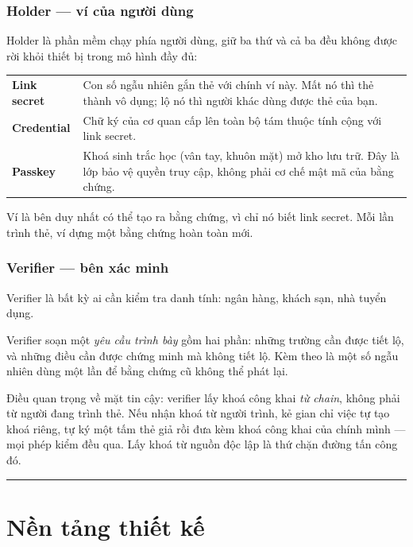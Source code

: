 \documentclass[a4paper,11pt]{article}
\begin{document}
\section{Holder --- ví của người dùng}

Holder là phần mềm chạy phía người dùng, giữ ba thứ và cả ba đều không được rời khỏi thiết
bị trong mô hình đầy đủ:

\begin{center}
\begin{tabular}{@{}p{3.4cm}p{10.4cm}@{}}
\toprule
\textbf{\sffamily Link secret} & Con số ngẫu nhiên gắn thẻ với chính ví này. Mất nó thì thẻ
thành vô dụng; lộ nó thì người khác dùng được thẻ của bạn. \\
\addlinespace
\textbf{\sffamily Credential} & Chữ ký của cơ quan cấp lên toàn bộ tám thuộc tính cộng với
link secret. \\
\addlinespace
\textbf{\sffamily Passkey} & Khoá sinh trắc học (vân tay, khuôn mặt) mở kho lưu trữ. Đây là
lớp bảo vệ quyền truy cập, không phải cơ chế mật mã của bằng chứng. \\
\bottomrule
\end{tabular}
\end{center}

Ví là bên duy nhất có thể tạo ra bằng chứng, vì chỉ nó biết link secret. Mỗi lần trình
thẻ, ví dựng một bằng chứng hoàn toàn mới.

\section{Verifier --- bên xác minh}

Verifier là bất kỳ ai cần kiểm tra danh tính: ngân hàng, khách sạn, nhà tuyển dụng.

Verifier soạn một \emph{yêu cầu trình bày} gồm hai phần: những trường cần được tiết lộ, và
những điều cần được chứng minh mà không tiết lộ. Kèm theo là một số ngẫu nhiên dùng một lần
để bằng chứng cũ không thể phát lại.

Điều quan trọng về mặt tin cậy: verifier lấy khoá công khai \emph{từ chain}, không phải từ
người đang trình thẻ. Nếu nhận khoá từ người trình, kẻ gian chỉ việc tự tạo khoá riêng, tự
ký một tấm thẻ giả rồi đưa kèm khoá công khai của chính mình --- mọi phép kiểm đều qua.
Lấy khoá từ nguồn độc lập là thứ chặn đường tấn công đó.

\vspace{4mm}
\hrule
\vspace{6mm}

\part*{\sffamily Nền tảng thiết kế}
\end{document}
